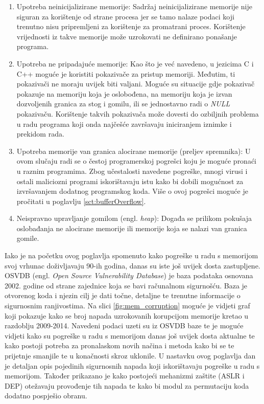 \documentclass[times, utf8, diplomski, numeric]{fer}
\begin{document}
\begin{enumerate}

\item Upotreba neinicijalizirane memorije: Sadržaj neinicijalizirane
memorije nije siguran za korištenje od strane procesa jer se tamo 
nalaze podaci koji trenutno nisu pripremljeni za korištenje za 
promatrani proces. Korištenje					%
vrijednosti iz takve memorije može uzrokovati ne definirano
ponašanje programa.

\item Upotreba ne pripadajuće memorije: Kao što je već navedeno,
u jezicima C i C++ moguće je koristiti pokazivače za pristup
memoriji. Međutim, ti pokazivači ne moraju uvijek biti valjani.
Moguće su situacije gdje pokazivač pokazuje na memoriju koja je
oslobođena, na memoriju koja je izvan dozvoljenih granica za stog
i gomilu, ili se jednostavno radi o \emph{NULL} pokazivaču.
Korištenje takvih pokazivača može dovesti do ozbiljnih problema u
radu programa koji onda najčešće završavaju iniciranjem iznimke i
prekidom rada.

\item Upotreba memorije van granica alocirane memorije (preljev
spremnika): U ovom slučaju radi se o čestoj			%
programerskoj pogrešci koju je moguće pronaći u raznim
programima. Zbog učestalosti navedene pogreške, mnogi virusi i
ostali maliciozni programi iskorištavaju istu kako bi dobili
mogućnost za izvršavanjem dodatnog programskog koda. Više o ovoj pogrešci
moguće je pročitati u poglavlju \ref{sct:bufferOverflow}.

\item Neispravno upravljanje gomilom (engl. \emph{heap}): Događa				%
se prilikom pokušaja oslobađanja ne alocirane memorije ili
memorije koja se nalazi van granica gomile. 

\end{enumerate}

Iako je na početku ovog poglavlja spomenuto kako pogreške u radu
s memorijom svoj vrhunac doživljavaju 90-ih godina,
danas su iste još uvijek dosta zastupljene. OSVDB 
(engl. \emph{Open Source Vulnerability Database}) je baza podataka			%
osnovana 2002. godine od strane zajednice koja se bavi računalnom
sigurnošću. Baza je otvorenog koda i njezin cilj je dati točne,
detaljne te trenutne informacije o sigurnosnim ranjivostima. Na
slici \ref{fig:mem_corruption} moguće je vidjeti graf koji
pokazuje kako se broj napada uzrokovanih korupcijom memorije
kretao u razdoblju 2009-2014. Navedeni podaci uzeti su iz OSVDB
baze te je moguće vidjeti kako su pogreške u radu s memorijom
 danas još uvijek dosta aktualne te kako postoji potreba
za pronalaskom novih načina i metoda kako bi se te prijetnje
smanjile te u konačnosti skroz uklonile. U nastavku ovog
poglavlja dan je detaljan opis pojedinih sigurnosnih napada koji
iskorištavaju pogreške u radu s memorijom. Također
prikazano je kako postojeći mehanizmi zaštite (ASLR i DEP) 
otežavaju provođenje tih napada te kako bi modul za permutaciju
koda dodatno pospješio obranu. 
\end{document}
